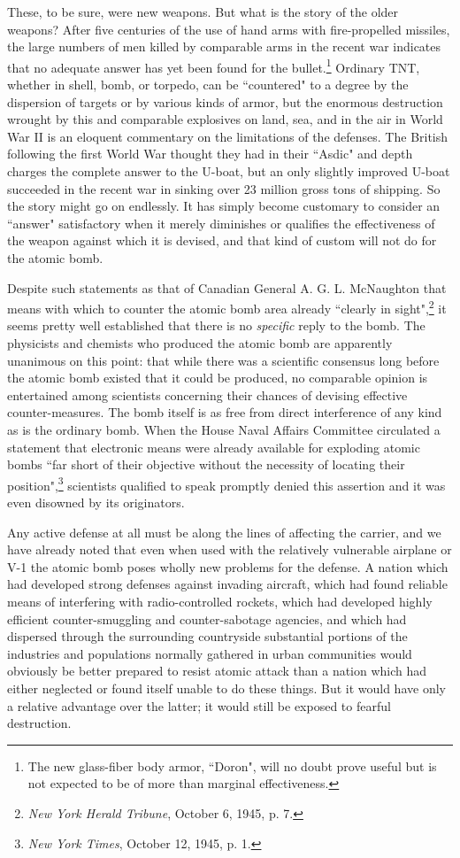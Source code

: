 These, to be sure, were new weapons. But what is the story of the older weapons? After five centuries of the use of hand arms with fire-propelled missiles, the large numbers of men killed by comparable arms in the recent war indicates that no adequate answer has yet been found for the bullet.\footnote{The new glass-fiber body armor, ``Doron", will no doubt prove useful but is not expected to be of more than marginal effectiveness.} Ordinary TNT, whether in shell, bomb, or torpedo, can be ``countered" to a degree by the dispersion of targets or by various kinds of armor, but the enormous destruction wrought by this and comparable explosives on land, sea, and in the air in World War II is an eloquent commentary on the limitations of the defenses. The British following the first World War thought they had in their ``Asdic" and depth charges the complete answer to the U-boat, but an only slightly improved U-boat succeeded in the recent war in sinking over 23 million gross tons of shipping. So the story might go on endlessly. It has simply become customary to consider an ``answer" satisfactory when it merely diminishes or qualifies the effectiveness of the weapon against which it is devised, and that kind of custom will not do for the atomic bomb.

Despite such statements as that of Canadian General A. G. L. McNaughton that means with which to counter the atomic bomb area already ``clearly in sight",\footnote{\textit{New York Herald Tribune}, October 6, 1945, p. 7.} it seems pretty well established that there is no \emph{specific} reply to the bomb. The physicists and chemists who produced the atomic bomb are apparently unanimous on this point: that while there was a scientific consensus long before the atomic bomb existed that it could be produced, no comparable opinion is entertained among scientists concerning their chances of devising effective counter-measures. The bomb itself is as free from direct interference of any kind as is the ordinary bomb. When the House Naval Affairs Committee circulated a statement that electronic means were already available for exploding atomic bombs ``far short of their objective without the necessity of locating their position",\footnote{\textit{New York Times}, October 12, 1945, p. 1.} scientists qualified to speak promptly denied this assertion and it was even disowned by its originators.

Any active defense at all must be along the lines of affecting the carrier, and we have already noted that even when used with the relatively vulnerable airplane or V-1 the atomic bomb poses wholly new problems for the defense. A nation which had developed strong defenses against invading aircraft, which had found reliable means of interfering with radio-controlled rockets, which had developed highly efficient counter-smuggling and counter-sabotage agencies, and which had dispersed through the surrounding countryside substantial portions of the industries and populations normally gathered in urban communities would obviously be better prepared to resist atomic attack than a nation which had either neglected or found itself unable to do these things. But it would have only a relative advantage over the latter; it would still be exposed to fearful destruction.

